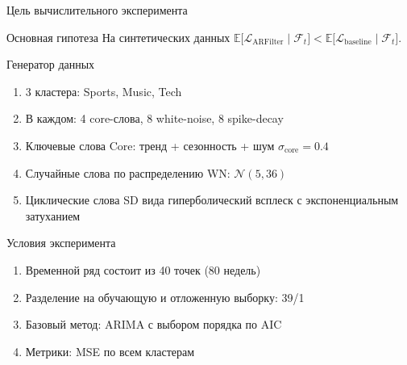\documentclass{beamer}
\begin{document}
\begin{frame}{Цель вычислительного эксперимента}
\begin{block}{Основная гипотеза}
На синтетических данных \(
  \mathbb{E}\!\bigl[\mathcal L_{\mathrm{ARFilter}}\mid \mathcal{F}_{t}\bigr]
  <
  \mathbb{E}\!\bigl[\mathcal L_{\mathrm{baseline}}\mid \mathcal{F}_{t}\bigr]
\).
\end{block}

\begin{block}{Генератор данных}
\vspace{-0.2cm}
\begin{enumerate}
\item 3 кластера: Sports, Music, Tech
\item В каждом: 4 core-слова, 8 white-noise, 8 spike-decay
\item Ключевые слова Core: тренд + сезонность + шум \(\sigma_{\mathrm{core}}=0.4\)
\item Случайные слова по распределению WN: \(\mathcal{N}(5, 36)\)
\item Циклические слова SD вида гиперболический всплеск с экспоненциальным затуханием
\end{enumerate}
\end{block}

\vspace{-0.3cm}
\begin{block}{Условия эксперимента}
\vspace{-0.2cm}
\begin{enumerate}
\item Временной ряд состоит из 40 точек (80 недель)
\item Разделение на обучающую и отложенную выборку: 39/1
\item Базовый метод: ARIMA с выбором порядка по AIC
\item Метрики: MSE по всем кластерам
\end{enumerate}
\end{block}
\end{frame}
\end{document}

